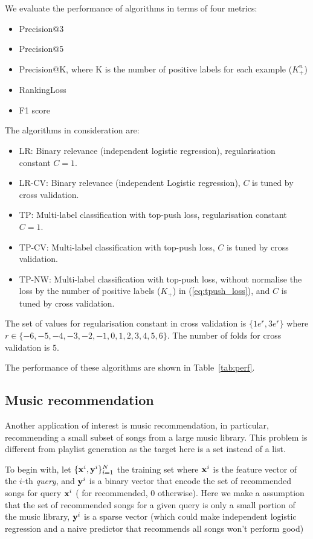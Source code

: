\noindent
We evaluate the performance of algorithms in terms of four metrics:
\begin{itemize}
\item Precision@3
\item Precision@5
\item Precision@K, where K is the number of positive labels for each example (\ie $K_+^n$)
\item RankingLoss
\item F1 score
\end{itemize}

\noindent
The algorithms in consideration are:
\begin{itemize}
\item LR: Binary relevance (\ie independent logistic regression), regularisation constant $C = 1$.
\item LR-CV: Binary relevance (\ie independent Logistic regression), $C$ is tuned by cross validation.
\item TP: Multi-label classification with top-push loss, regularisation constant $C=1$.
\item TP-CV: Multi-label classification with top-push loss, $C$ is tuned by cross validation.
\item TP-NW: Multi-label classification with top-push loss, without normalise the loss by the number of positive labels (\ie $K_+$)
             in (\ref{eq:tpush_loss}), and $C$ is tuned by cross validation.
\end{itemize}
The set of values for regularisation constant in cross validation is 
$\{ 1e^{r}, 3e^{r} \}$ where $r \in \{-6, -5, -4, -3, -2, -1, 0, 1, 2, 3, 4, 5, 6\}$. 
The number of folds for cross validation is $5$.


\noindent
The performance of these algorithms are shown in Table~\ref{tab:perf}.




\subsection{Music recommendation}

Another application of interest is music recommendation, in particular, recommending a small subset of songs from a large music library.
This problem is different from playlist generation%
as the target here is a set instead of a list.

To begin with, let $\{\mathbf{x}^i, \mathbf{y}^i\}_{i=1}^N$ the training set where $\mathbf{x}^i$ is the feature vector of the $i$-th \emph{query},
and $\mathbf{y}^i$ is a binary vector that encode the set of recommended songs for query $\mathbf{x}^i$ ( for recommended, 0 otherwise).
Here we make a assumption that the set of recommended songs for a given query is only a small portion of the music library,
\ie $\mathbf{y}^i$ is a sparse vector (which could make independent logistic regression and a naive predictor that recommends all songs won't perform good)

